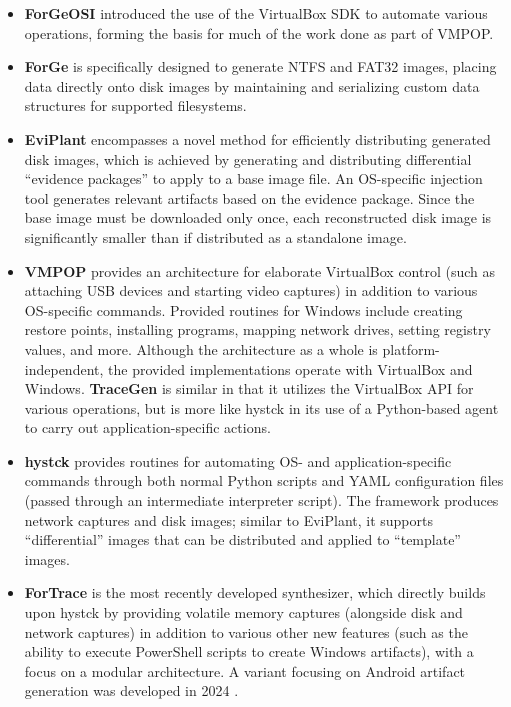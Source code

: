 \documentclass[final,5p,times,twocolumn]{elsarticle}
\begin{document}
\begin{itemize}
\item
  \textbf{ForGeOSI} \cite{maxfraggMaxfraggForGeOSI2023} introduced
  the use of the VirtualBox SDK to automate various operations, forming
  the basis for much of the work done as part of VMPOP.
\item
  \textbf{ForGe} \cite{vistiAutomaticCreationComputer2015} is
  specifically designed to generate NTFS and FAT32 images, placing data
  directly onto disk images by maintaining and serializing custom data
  structures for supported filesystems.
\item
  \textbf{EviPlant} \cite{scanlonEviPlantEfficientDigital2017}
  encompasses a novel method for efficiently distributing generated disk
  images, which is achieved by generating and distributing differential
  ``evidence packages'' to apply to a base image file. An OS-specific
  injection tool generates relevant artifacts based on the evidence
  package. Since the base image must be downloaded only once, each
  reconstructed disk image is significantly smaller than if distributed
  as a standalone image.
\item
  \textbf{VMPOP} \cite{parkTREDEVMPOPCultivating2018} provides an
  architecture for elaborate VirtualBox control (such as attaching USB
  devices and starting video captures) in addition to various
  OS-specific commands. Provided routines for Windows include creating
  restore points, installing programs, mapping network drives, setting
  registry values, and more. Although the architecture as a whole is
  platform-independent, the provided implementations operate with
  VirtualBox and Windows. \textbf{TraceGen}
  \cite{duTraceGenUserActivity2021} is similar in that it utilizes
  the VirtualBox API for various operations, but is more like hystck in
  its use of a Python-based agent to carry out application-specific
  actions.
\item
  \textbf{hystck} \cite{gobelNovelApproachGenerating2020} provides
  routines for automating OS- and application-specific commands through
  both normal Python scripts and YAML configuration files (passed
  through an intermediate interpreter script). The framework produces
  network captures and disk images; similar to EviPlant, it supports
  ``differential'' images that can be distributed and applied to
  ``template'' images.
\item
  \textbf{ForTrace} \cite{gobelForTraceHolisticForensic2022} is the
  most recently developed synthesizer, which directly builds upon hystck
  by providing volatile memory captures (alongside disk and network
  captures) in addition to various other new features (such as the
  ability to execute PowerShell scripts to create Windows artifacts),
  with a focus on a modular architecture. A variant focusing on Android
  artifact generation was developed in 2024
  \cite{demmelDataSynthesisGoing2024}.
\end{itemize}
\end{document}

